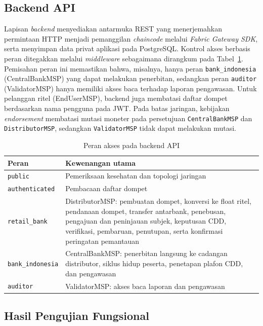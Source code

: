 \subsection{Backend API}

Lapisan \textit{backend} menyediakan antarmuka REST yang menerjemahkan permintaan
HTTP menjadi pemanggilan \textit{chaincode} melalui \textit{Fabric Gateway SDK},
serta menyimpan data privat aplikasi pada PostgreSQL. Kontrol akses berbasis peran
ditegakkan melalui \textit{middleware} sebagaimana dirangkum pada
Tabel~\ref{tab:peran}. Pemisahan peran ini memastikan bahwa, misalnya, hanya peran
\texttt{bank\_indonesia} (CentralBankMSP) yang dapat melakukan penerbitan, sedangkan
peran \texttt{auditor} (ValidatorMSP) hanya memiliki akses baca terhadap laporan
pengawasan. Untuk pelanggan ritel (EndUserMSP), backend juga membatasi
daftar dompet berdasarkan nama pengguna pada JWT. Pada batas jaringan, kebijakan
\textit{endorsement} membatasi mutasi moneter pada persetujuan \texttt{CentralBankMSP}
dan \texttt{DistributorMSP}, sedangkan \texttt{ValidatorMSP} tidak dapat melakukan mutasi.

\begingroup
\renewcommand{\arraystretch}{1.3}
\begin{table}[H]
\caption{Peran akses pada backend API}
\label{tab:peran}
\centering
\begin{tabular}{p{3.2cm} p{9.8cm}}
\toprule
\textbf{Peran} & \textbf{Kewenangan utama} \\
\midrule
\texttt{public} & Pemeriksaan kesehatan dan topologi jaringan \\
\texttt{authen\allowbreak ticated} & Pembacaan daftar dompet \\
\texttt{retail\_bank} & DistributorMSP: pembuatan dompet, konversi ke float ritel, pendanaan dompet, transfer antarbank, penebusan, pengajuan dan peninjauan subjek, keputusan CDD, verifikasi, pembaruan, penutupan, serta konfirmasi peringatan pemantauan \\
\texttt{bank\allowbreak\_indonesia} & CentralBankMSP: penerbitan langsung ke cadangan distributor, siklus hidup peserta, penetapan plafon CDD, dan pengawasan \\
\texttt{auditor} & ValidatorMSP: akses baca laporan dan pengawasan \\
\bottomrule
\end{tabular}
\end{table}
\endgroup

\subsection{Hasil Pengujian Fungsional}

